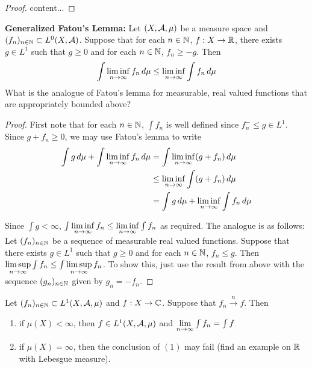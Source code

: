 \documentclass{book}
\begin{document}
	\begin{proof}
		content...
	\end{proof}
	
	\begin{ex}  \textbf{Generalized Fatou's Lemma:}
		Let $(X, \mathcal{A}, \mu)$ be a measure space and $(f_n)_{n \in \mathbb{N}} \subset L^0(X, \mathcal{A})$. Suppose that for each $n \in \mathbb{N}$, $f:X \rightarrow \mathbb{R}$, there exists $g \in L^1$ such that $g \geq 0$ and for each $n \in \mathbb{N}$, $f_n \geq -g$. Then 
		$$ \int \liminf \limits_{n \rightarrow \infty} f_n \, d \mu \leq \liminf \limits_{n \rightarrow \infty} \int f_n \, d \mu $$ 
		What is the analogue of Fatou's lemma for measurable, real valued functions that are appropriately bounded above?  
	\end{ex}
	
	\begin{proof}
		First note that for each $n \in \mathbb{N}$, $\int f_n$ is well defined since $f_n^- \leq g \in L^1$. Since $g + f_n \geq 0$, we may use Fatou's lemma to write
		\begin{align*}
			\int g \, d \mu + \int \liminf \limits_{n \rightarrow \infty} f_n \, d \mu 
			&= \int \liminf \limits_{n \rightarrow \infty} (g+f_n)  \, d \mu \\
			& \leq \liminf \limits_{n \rightarrow \infty} \int (g + f_n) \, d \mu \\
			&= \int g \, d \mu + \liminf \limits_{n \rightarrow \infty} \int f_n \, d \mu 
		\end{align*}
		
		Since $\int g < \infty$, $\int \liminf \limits_{n \rightarrow \infty} f_n \leq \liminf \limits_{n \rightarrow \infty} \int f_n$ as required. The analogue is as follows: Let $(f_n)_{n \in \mathbb{N}}$ be a sequence of measurable real valued functions. Suppose that there exists $g \in L^1$ such that $g \geq 0$ and for each $n \in \mathbb{N}$, $f_n \leq g$. Then $\limsup \limits_{n \rightarrow \infty} \int f_n \leq \int \limsup \limits_{n \rightarrow \infty} f_n$. To show this, just use the result from above with the sequence $(g_n)_{n \in \mathbb{N}}$ given by $g_n = -f_n$.
		
	\end{proof}
	
	\begin{ex}  
		Let $(f_n)_{n \in \mathbb{N}} \subset L^1(X, \mathcal{A}, \mu)$ and $f:X \rightarrow \mathbb{C}$. Suppose that $f_n \xrightarrow{\text{u}} f$. Then 
		\begin{enumerate}
			\item if $\mu(X) < \infty$, then $f \in L^1(X, \mathcal{A}, \mu)$ and $\lim \limits_{n \rightarrow \infty} \int f_n = \int f$
			\item if $\mu(X) = \infty$, then the conclusion of $(1)$ may fail (find an example on $\mathbb{R}$ with Lebesgue measure).
		\end{enumerate}
	\end{ex}
	
\end{document}
